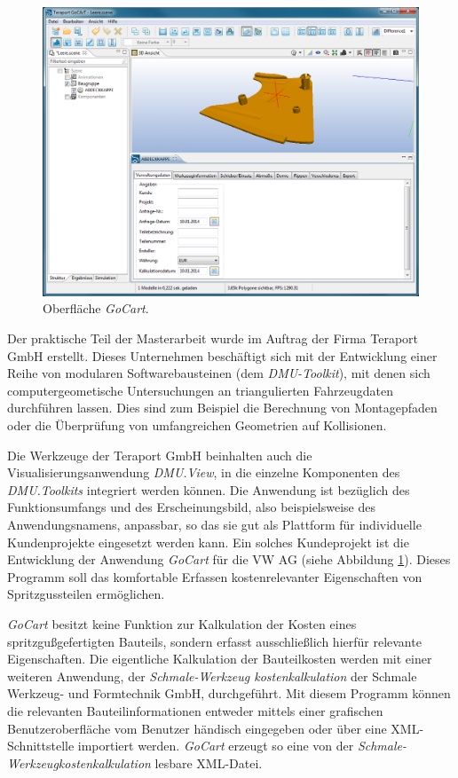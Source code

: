 \begin{figure}[H]
\centerline{
	\includegraphics[width=0.95\columnwidth]{graphics/goCart.png}
}
\caption{Oberfl\"ache \textit{GoCart}.}
\label{im:goCart}
\end{figure}

Der praktische Teil der Masterarbeit wurde im Auftrag der Firma Teraport GmbH erstellt. Dieses Unternehmen besch\"aftigt sich mit der Entwicklung einer Reihe von modularen Softwarebausteinen (dem \textit{DMU-Toolkit}), mit denen sich computergeometische Untersuchungen an triangulierten Fahrzeugdaten durchf\"uhren lassen. Dies sind zum Beispiel die Berechnung von Montagepfaden oder die \"Uberpr\"ufung von umfangreichen Geometrien auf Kollisionen. 

Die Werkzeuge der Teraport GmbH beinhalten auch die Visualisierungsanwendung \textit{DMU.View}, in die einzelne Komponenten des \textit{DMU.Toolkits} integriert werden k\"onnen. Die Anwendung ist bez\"uglich des Funktionsumfangs und des Erscheinungsbild, also beispielsweise des Anwendungsnamens, anpassbar, so das sie gut als Plattform f\"ur individuelle Kundenprojekte eingesetzt werden kann. Ein solches Kundeprojekt ist die Entwicklung der Anwendung \textit{GoCart} f\"ur die VW AG (siehe Abbildung \ref{im:goCart}). Dieses Programm soll das komfortable Erfassen kostenrelevanter Eigenschaften von Spritzgussteilen erm\"oglichen.  

\textit{GoCart} besitzt keine Funktion zur Kalkulation der Kosten eines spritzgu{\ss}gefertigten Bauteils, sondern erfasst ausschlie{\ss}lich hierf\"ur relevante Eigenschaften. Die eigentliche Kalkulation der Bauteilkosten werden mit einer weiteren Anwendung, der \textit{Schmale-Werkzeug kostenkalkulation} der Schmale Werkzeug- und Formtechnik GmbH, durchgef\"uhrt. Mit diesem Programm k\"onnen die relevanten Bauteilinformationen entweder mittels einer grafischen Benutzeroberfl\"ache vom Benutzer h\"andisch eingegeben oder über eine XML-Schnittstelle importiert werden. \textit{GoCart} erzeugt so eine von der \textit{Schmale-Werkzeugkostenkalkulation} lesbare XML-Datei.


